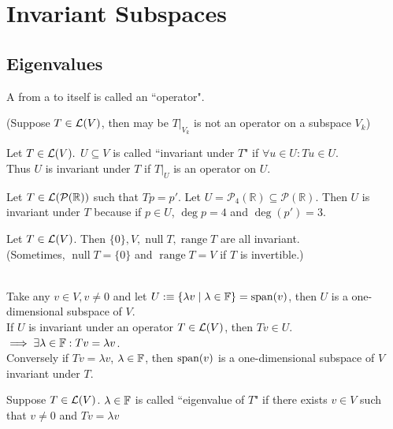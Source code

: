 \section{Invariant Subspaces}
\subsection{Eigenvalues}

\begin{mydef}
  A \lm from a \vs to itself is called an ``operator".
\end{mydef}

(Suppose $T\in \mathcal{L}(V)$, then may be $\left.T\right|_{V_{k}}$ is not an operator on a subspace $V_k$)

\begin{mydef}
  Let $T\in \mathcal{L}(V).$ $U \subseteq V$ is called ``invariant under $T$" if $\forall u \in U: Tu \in U.$ \\
  Thus $U$ is invariant under $T$ if $\left.T\right|_{U}$ is an operator on $U.$
\end{mydef}

\begin{example}
  Let $T\in \mathcal{L}(\mathcal{P}(\mathbb{R}))$ such that $Tp=p'.$ Let $U=\mathcal{P}_4(\mathbb{R}) \subseteq \mathcal{P}(\mathbb{R}).$ Then $U$ is invariant under $T$
  because if $p \in U$, $\deg p = 4$ and $\deg (p')=3$.
\end{example}

\begin{example}
  Let $T\in \mathcal{L}(V)$. Then $\{0\}, V, \operatorname{null} T, \operatorname{range} T$ are all invariant. \\
  (Sometimes, $\operatorname{null} T = \{0\}$ and $\operatorname{range} T=V$ if $T$ is invertible.)
\end{example}

\bigbreak

 \\
Take any $v\in V, v\neq 0$ and let $U :\equiv \{  \lambda v \mid \lambda \in \mathbb{F} \} = \operatorname{span} (v)$, then $U$ is a one-dimensional subspace of $V$. \\
If $U$ is invariant under an operator $T \in \mathcal{L} (V)$, then $Tv  \in U$. $\implies \exists \lambda \in \mathbb{F}: Tv = \lambda v$. \\
Conversely if $Tv = \lambda v$, $\lambda \in \mathbb{F}$, then $\operatorname{span} (v)$ is a one-dimensional subspace of $V$ invariant under $T$.

\begin{mydef}
  Suppose $T\in \mathcal{L} (V)$. $\lambda \in \mathbb{F}$ is called ``eigenvalue of $T$" if there exists $v \in V$ such that $v \neq 0$ and $Tv = \lambda v$
\end{mydef}

